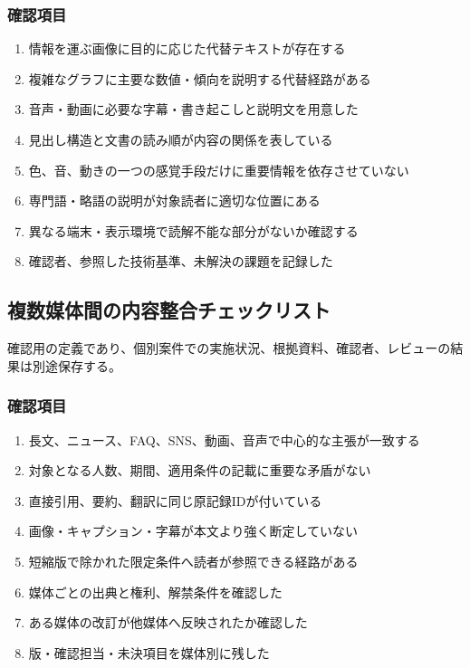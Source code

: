 \documentclass[a4paper,11pt]{article}
\begin{document}
\subsubsection*{確認項目}
\begin{enumerate}[leftmargin=2em,itemsep=0.3em]
\item 情報を運ぶ画像に目的に応じた代替テキストが存在する\par
\item 複雑なグラフに主要な数値・傾向を説明する代替経路がある\par
\item 音声・動画に必要な字幕・書き起こしと説明文を用意した\par
\item 見出し構造と文書の読み順が内容の関係を表している\par
\item 色、音、動きの一つの感覚手段だけに重要情報を依存させていない\par
\item 専門語・略語の説明が対象読者に適切な位置にある\par
\item 異なる端末・表示環境で読解不能な部分がないか確認する\par
\item 確認者、参照した技術基準、未解決の課題を記録した\par
\end{enumerate}
\subsection{複数媒体間の内容整合チェックリスト}
\par 確認用の定義であり、個別案件での実施状況、根拠資料、確認者、レビューの結果は別途保存する。\par\medskip
\subsubsection*{確認項目}
\begin{enumerate}[leftmargin=2em,itemsep=0.3em]
\item 長文、ニュース、FAQ、SNS、動画、音声で中心的な主張が一致する\par
\item 対象となる人数、期間、適用条件の記載に重要な矛盾がない\par
\item 直接引用、要約、翻訳に同じ原記録IDが付いている\par
\item 画像・キャプション・字幕が本文より強く断定していない\par
\item 短縮版で除かれた限定条件へ読者が参照できる経路がある\par
\item 媒体ごとの出典と権利、解禁条件を確認した\par
\item ある媒体の改訂が他媒体へ反映されたか確認した\par
\item 版・確認担当・未決項目を媒体別に残した\par
\end{enumerate}
\end{document}
